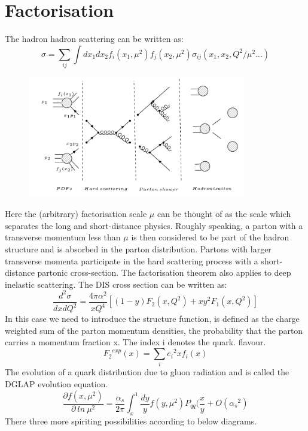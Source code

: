 \section{Factorisation}
The hadron hadron scattering can be written as:
\begin{equation}
\sigma = \sum_{ij} \int dx_1 dx_2 f_i(x_1, \mu^2)f_j(x_2, \mu^2) \sigma_{ij}(x_1, x_2, Q^2/\mu^2... )
\end{equation}
\begin{figure}[h!]
\centering
\includegraphics[width=0.85\textwidth]{images/Intro/Hard.png}
\end{figure}
Here the (arbitrary) factorisation scale $ \mu $ can be thought of
as the scale which separates the long and short-distance physics.
Roughly speaking, a parton with a transverse momentum less
than $ \mu $ is then considered to be part of the hadron structure and
is absorbed in the parton distribution. Partons with larger transverse
momenta participate in the hard scattering process with a
short-distance partonic cross-section.
The factorisation theorem also applies to deep inelastic scattering. The DIS cross section can be written as:
\begin{equation}
\frac{d^2 \sigma}{dx dQ^2}=\frac{4\pi \alpha^2}{x Q^4}[(1-y)F_2 (x, Q^2)+xy^2 F_1(x, Q^2)]
\end{equation}
In this case we need to introduce the structure function, is defined as the charge weighted sum of the parton momentum densities, the probability that the parton carries a momentum
fraction x. The index i denotes the quark. 
flavour.
\begin{equation}
{{F}_2}^{exp} (x)= \sum_i {e_i}^2 x f_i(x)
\end{equation}
The evolution of a quark
distribution due to gluon radiation and is called the DGLAP
evolution equation.
\begin{equation}
\frac{\partial f(x, \mu^2) }{\partial \: ln \:\mu^2}=
\frac{\alpha_s}{2\pi}\int_{x}^{1}\frac{dy}{y} f(y, \mu^2) P_{qq}(\frac{x}{y}+O({\alpha_s}^2)
\end{equation}
There three more spiriting possibilities according to below diagrams.

